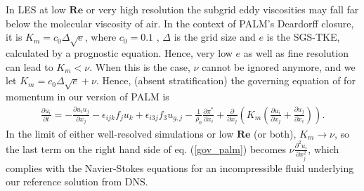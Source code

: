 \documentclass[draft,a4paper,11pt]{article}
\newcommand{\RE}{\mathbf{Re}}
\begin{document}
In LES at low $\RE$ or very high resolution the subgrid eddy viscosities may fall far below the molecular viscosity of air. In the context of PALM's Deardorff closure, it is $K_m = c_0 \Delta \sqrt{e}$, where $c_0 = 0.1$ \citep{deardorff1980stratocumulus}, $\Delta$ is the grid size and $e$ is the SGS-TKE, calculated by a prognostic equation. Hence, very low $e$ as well as fine resolution can lead to $K_m<\nu$. When this is the case, $\nu$ cannot be ignored anymore, and we let $K_m = c_0 \Delta \sqrt{e} + \nu$. Hence, (absent stratification) the governing equation of for momentum in our version of PALM is
\begin{align}\label{gov_palm}
  \frac{\partial u_i}{\partial t} = - \frac{\partial u_i u_j}{\partial x_j} -\epsilon_{ijk}f_ju_k + \epsilon_{i3j} f_3 u_{g,j} - \frac{1}{\rho_0}\frac{\partial\pi^*}{\partial x_i} + \frac{\partial}{\partial x_j}\left( K_m\left(\frac{\partial u_i}{\partial x_j} + \frac{\partial u_j}{\partial x_i} \right)\right).
\end{align}
In the limit of either well-resolved simulations or low $\RE$ (or both), $K_m \rightarrow \nu$, so the last term on the right hand side of eq. (\ref{gov_palm}) becomes $\nu\frac{\partial^2u_i}{\partial x_j^2}$, which complies with the Navier-Stokes equations for an incompressible fluid underlying our reference solution from DNS.

\label{low-bound}
\end{document}
